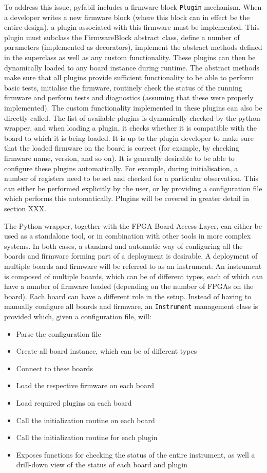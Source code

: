 \documentclass[a4paper,11pt]{article}
\begin{document}
To address this issue, pyfabil includes a firmware block \texttt{Plugin} 
mechanism. When a developer writes a new firmware block (where this block can in 
effect be the entire design), a plugin associated with this firmware must be 
implemented. This plugin must subclass the FirmwareBlock abstract class, define 
a number of parameters (implemented as decorators), implement the abstract 
methods defined in the superclass as well as any custom functionality. These 
plugins can then be dynamically loaded to any board instance during runtime. The 
abstract methods make sure that all plugins provide sufficient functionality to 
be able to perform basic tests, initialise the firmware, routinely check the 
status of the running firmware and perform tests and diagnostics (assuming that 
these were properly implemented). The custom functionality implemented in these 
plugins can also be directly called. The list of available plugins is 
dynamically checked by the python wrapper, and when loading a plugin, it checks 
whether it is compatible with the board to which it is being loaded. It is up to 
the plugin developer to make sure that the loaded firmware on the board is 
correct (for example, by checking firmware name, version, and so on). It is 
generally desirable to be able to configure these plugins automatically. For 
example, during initialisation, a number of registers need to be set and checked 
for a particular observation. This can either be performed explicitly by the 
user, or by providing a configuration file which performs this automatically. 
Plugins will be covered in greater detail in section XXX.

The Python wrapper, together with the FPGA Board Access Layer, can either be 
used as a standalone tool, or in combination with other tools in more complex 
systems. In both cases, a standard and automatic way of configuring all the 
boards and firmware forming part of a deployment is desirable. A deployment of 
multiple boards and firmware will be referred to as an instrument. An instrument 
is composed of multiple boards, which can be of different types, each of which 
can have a number of firmware loaded (depending on the number of FPGAs on the 
board). Each board can have a different role in the setup. Instead of having to 
manually configure all boards and firmware, an \texttt{Instrument} management 
class is provided which, given a configuration file, will:
\begin{itemize}
 \item Parse the configuration file 
 \item Create all board instance, which can be of different types
 \item Connect to these boards
 \item Load the respective firmware on each board
 \item Load required plugins on each board
 \item Call the initialization routine on each board
 \item Call the initialization routine for each plugin
 \item Exposes functions for checking the status of the entire instrument, as 
well a drill-down view of the status of each board and plugin
\end{itemize}
\end{document}
